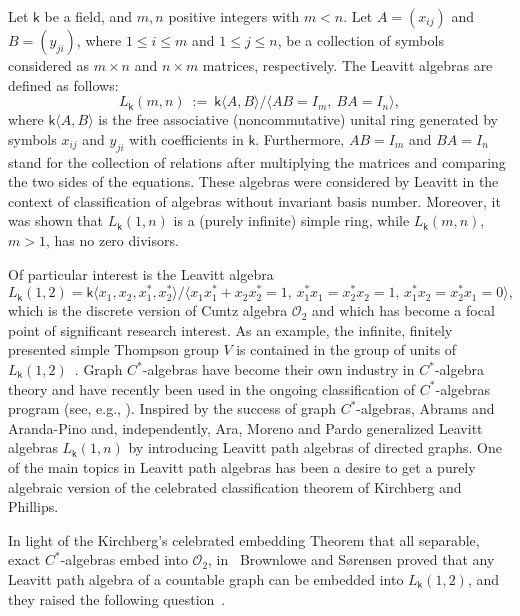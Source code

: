 \documentclass[a4paper, 11pt, reqno]{amsart}
\theoremstyle{definition}
\newcommand{\K}{\mathsf{k}}
\begin{document}
 Let $\K$ be a field, and $m, n$ positive integers with $m < n$.  Let $A=(x_{ij})$ and $B=(y_{ji})$, where $1\leq i \leq m$ and $1\leq j \leq n$, be a collection of symbols considered as $m\times n$ and $n\times m$ matrices, respectively.  The Leavitt algebras are defined as follows:  
\begin{equation}\label{firstdef}
L_\K(m,n) \  := \  \K\big\langle A, B\big\rangle\big /  \big\langle A B = I_m,  \ BA=I_n \big\rangle,
\end{equation}
\noindent
where $\K\langle A, B\rangle$ is the free associative (noncommutative) unital ring generated by symbols $x_{ij}$ and $y_{ji}$ with coefficients in $\K$. Furthermore,  $AB=I_m$ and $BA=I_n$ stand for the collection of relations after multiplying the matrices and comparing the two sides of the equations. These algebras were considered by Leavitt \cite{leavitt1, leavitt2} in the context of classification of algebras without invariant basis number. Moreover, it was shown that $L_\K(1,n)$ is a (purely infinite) simple ring, while  $L_\K(m,n)$, $m>1$,  has no zero divisors. 


Of particular interest is  the Leavitt algebra 
\[L_\K(1,2) = \K \langle x_1, x_2, x_1^*, x_2^* \rangle / \langle x_1 x_1^* + x_2 x_2^*=1, \,  x_1^* x_1= x_2^* x_2=1, \, x_1^*x_2 = x_2^*x_1 = 0\rangle,\]  which is  the discrete version of Cuntz algebra $\mathcal O_2$ and which has become a focal point of significant research interest. As an example, the infinite, finitely presented simple Thompson group $V$ is contained in the group of units of $L_\K(1,2)$~\cite{lpabook, sorensen}.  
Graph $C^*$-algebras have become their own industry in $C^*$-algebra theory and have recently been used in the ongoing classification of $C^*$-algebras program (see, e.g., \cite{rss2015}). Inspired by the success of graph $C^*$-algebras, Abrams and Aranda-Pino \cite{GenePino} and, independently, Ara, Moreno and Pardo \cite{ara2006} generalized Leavitt algebras $L_{\K}(1, n)$ by introducing Leavitt path algebras of directed graphs. One of the main topics in Leavitt path algebras has been a desire to get a purely algebraic version of the celebrated classification theorem of Kirchberg and Phillips.

In light of the Kirchberg's celebrated embedding Theorem that all separable, exact $C^*$-algebras embed into $\mathcal O_2$, in~\cite[Theorem 4.1]{brownsor}  Brownlowe and S\o rensen proved that any Leavitt path algebra of a countable graph can be embedded into $L_\K(1,2)$, and they raised the following question~\cite[p.~349]{brownsor}.  
\end{document}
